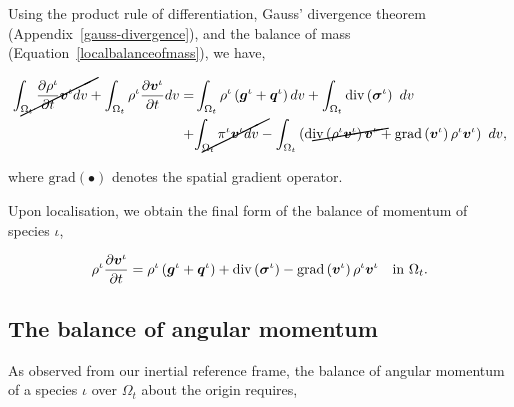 Using the product rule of differentiation, Gauss' divergence
theorem (Appendix~\ref{gauss-divergence}), and the balance of mass
(Equation~\ref{localbalanceofmass}), we have,



\begin{equation*}
\begin{split}
\cancel{\int_{\Omega_{t}} \frac{\partial \rho^{\iota}} {\partial t}
\bv^{\iota} dv} + \int_{\Omega_{t}} \rho^{\iota} \frac{\partial
  \bv^{\iota}} {\partial t} dv = 
& \int_{\Omega_{t}} \rho^{\iota} \left(\bg^{\iota}+\bq^{\iota}\right) dv 
+ \int_{\Omega_{t}} \mathrm{div}\left(\Bsigma^{\iota}\right)\ dv\\
+ & \cancel{\int_{\Omega_{t}} \pi^{\iota}\bv^{\iota} dv}
- \int_{\Omega_{t}}\left(\cancel{\mathrm{div}
\left(\rho^{\iota}\bv^{\iota}\right) \bv^{\iota}} +
\mathrm{grad}\left(\bv^{\iota}\right) \rho^{\iota}\bv^{\iota}\right)\ dv, 
\end{split}
\end{equation*}

where $\mathrm{grad} (\bullet)$ denotes the spatial gradient
operator.

Upon localisation, we obtain the final form of the balance of momentum
of species $\iota$,

\begin{equation}
\rho^{\iota} \frac{\partial \mbox{\boldmath$ v$}^{\iota}} {\partial t} = \rho^{\iota}
\left(\mbox{\boldmath$ g$}^{\iota}+\mbox{\boldmath$ q$}^{\iota}\right)  
+ \mathrm{div}\left(\mbox{\boldmath$\sigma$}^{\iota}\right)
- \mathrm{grad}\left(\mbox{\boldmath$ v$}^{\iota}\right) \rho^{\iota}\mbox{\boldmath$ v$}^{\iota}
\quad \mathrm{in}\ \Omega_{t}.
\label{localbalanceofmomentum}
\end{equation}


\subsection{The balance of angular momentum}
\label{eu-balance-of-angular-momentum}

As observed from our inertial reference frame, the balance of
angular momentum of a species $\iota$ over $\Omega_{t}$ about the
origin requires,


